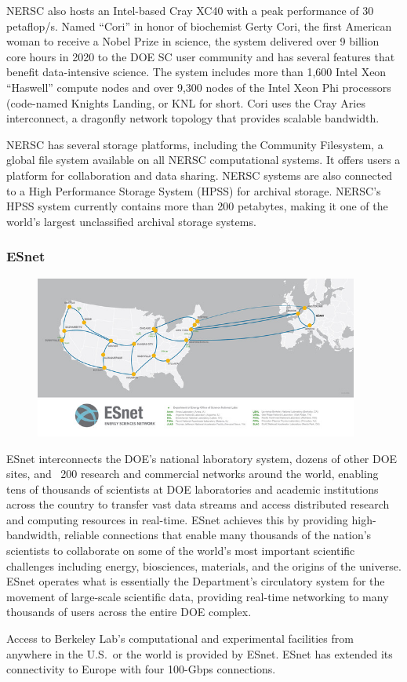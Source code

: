 NERSC also hosts an Intel-based Cray XC40 with a peak performance of 30 petaflop/s. Named ``Cori'' in honor of biochemist Gerty Cori, the first American woman to receive a Nobel Prize in science, the system delivered over 9 billion core hours in 2020 to the DOE SC user community and has several features that benefit data-intensive science. The system includes more than 1,600 Intel Xeon ``Haswell'' compute nodes and over 9,300 nodes of the Intel Xeon Phi processors (code-named Knights Landing, or KNL for short.  Cori uses the Cray Aries interconnect, a dragonfly network topology that provides scalable bandwidth.


NERSC has several storage platforms, including the Community Filesystem, a global file system available on all NERSC computational systems. It offers users a platform for collaboration and data sharing. NERSC systems are also connected to a High Performance Storage System (HPSS) for archival storage. NERSC's HPSS system currently contains more than 200 petabytes, making it one of the world's largest unclassified archival storage systems.


\subsubsection*{ESnet}

\begin{figure}[h]
  \begin{center}
    \includegraphics[width=0.95\textwidth]
    {images/esnet.jpeg}
  \end{center}
\end{figure}

ESnet interconnects the DOE's national laboratory system, dozens
of other DOE sites, and ~200 research and commercial networks around
the world, enabling tens of thousands of scientists at DOE laboratories
and academic institutions across the country to transfer vast data
streams and access distributed research and computing resources in
real-time. ESnet achieves this by providing high-bandwidth, reliable
connections that enable many thousands of the nation's scientists
to collaborate on some of the world's most important scientific
challenges including energy, biosciences, materials, and the origins
of the universe. ESnet operates what is essentially the Department's
circulatory system for the movement of large-scale scientific data,
providing real-time networking to many thousands of users across
the entire DOE complex.

Access to Berkeley Lab's computational and experimental facilities
from anywhere in the U.S.~or the world is provided by ESnet. ESnet
has extended its connectivity to Europe with four 100-Gbps connections.